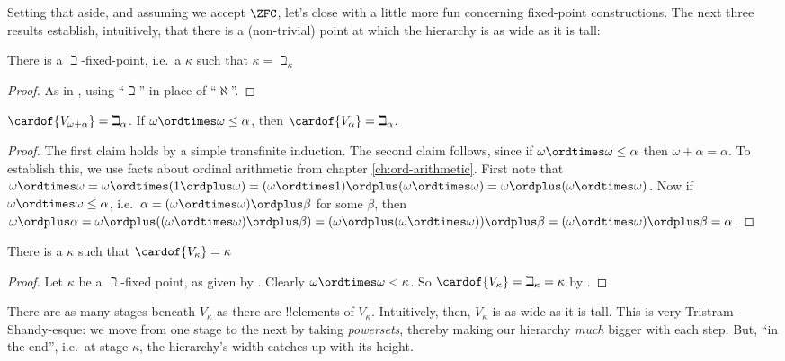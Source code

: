 \documentclass[../../../include/open-logic-section]{subfiles}
\begin{document}
Setting that aside, and assuming we accept $\ZFC$, let's close with a little more fun concerning fixed-point constructions. The next three results establish, intuitively, that there is a (non-trivial) point at which the hierarchy is as wide as it is tall:
\begin{prop}There is a $\beth$-fixed-point, i.e.\ a $\kappa$ such that $\kappa = \beth_\kappa$
	\end{prop}
\begin{proof}
	As in , using ``$\beth$'' in place of ``$\aleph$''. 
\end{proof}
\begin{prop}$\cardof{V_{\omega+\alpha}} = \beth_{\alpha}$. If $\omega \ordtimes \omega \leq \alpha$, then $\cardof{V_\alpha} = \beth_\alpha$.
\end{prop}
\begin{proof}
	The first claim holds by a simple transfinite induction. The second claim follows, since if $\omega \ordtimes \omega \leq \alpha$ then $\omega + \alpha = \alpha$. To establish this, we use facts about ordinal arithmetic from chapter \ref{ch:ord-arithmetic}. First note that 
	$\omega \ordtimes \omega = \omega \ordtimes (1 \ordplus \omega) = (\omega  \ordtimes 1) \ordplus (\omega\ordtimes\omega) = \omega \ordplus (\omega \ordtimes \omega)$. Now if $\omega \ordtimes \omega \leq \alpha$, i.e.\ $\alpha = (\omega\ordtimes\omega) \ordplus \beta$ for some $\beta$, then 
	$\omega \ordplus \alpha = \omega \ordplus ((\omega \ordtimes \omega) \ordplus \beta) = (\omega \ordplus (\omega \ordtimes \omega)) \ordplus \beta = (\omega \ordtimes \omega) \ordplus \beta = \alpha$. 
\end{proof}
\begin{cor}
	There is a $\kappa$ such that $\cardof{V_\kappa} = \kappa$
\end{cor}
\begin{proof}
	Let $\kappa$ be a $\beth$-fixed point, as given by . Clearly $\omega \ordtimes \omega < \kappa$. So $\cardof{V_\kappa} = \beth_\kappa = \kappa$ by .
\end{proof}\noindent
There are as many stages beneath $V_\kappa$ as there are !!{element}s of $V_\kappa$. Intuitively, then, $V_\kappa$ is as wide as it is tall. This is very Tristram-Shandy-esque: we move from one stage to the next by taking \emph{powersets}, thereby making our hierarchy \emph{much} bigger with each step. But, ``in the end'', i.e.\ at stage $\kappa$, the hierarchy's width catches up with its height. 
\end{document}
